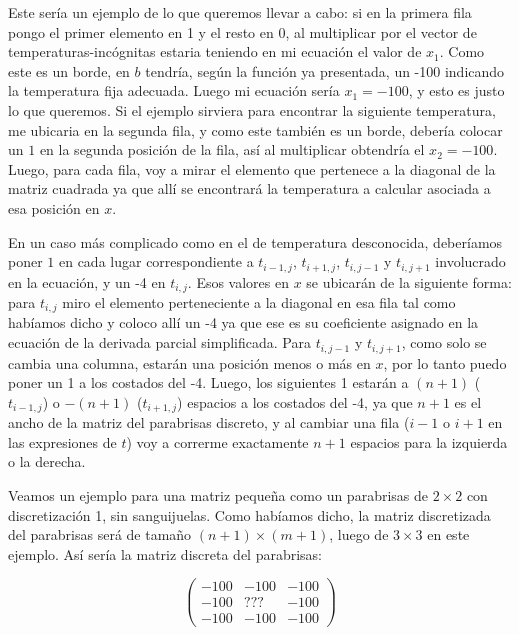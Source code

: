 \vspace{\baselineskip}

Este sería un ejemplo de lo que queremos llevar a cabo: si en la primera fila pongo el primer elemento en 1 y el resto en 0, al multiplicar por el vector de temperaturas-incógnitas estaria teniendo en mi ecuación el valor de $x_1$. Como este es un borde, en $b$ tendría, según la función ya presentada, un -100 indicando la temperatura fija adecuada. Luego mi ecuación sería $x_1 = -100$, y esto es justo lo que queremos. Si el ejemplo sirviera para encontrar la siguiente temperatura, me ubicaria en la segunda fila, y como este también es un borde, debería colocar un $1$ en la segunda posición de la fila, así al multiplicar obtendría el $x_2 = -100$. Luego, para cada fila, voy a mirar el elemento que pertenece a la diagonal de la matriz cuadrada ya que allí se encontrará la temperatura a calcular asociada a esa posición en $x$.

En un caso más complicado como en el de temperatura desconocida, deberíamos poner $1$ en cada lugar correspondiente a $t_{i-1,j}$, $t_{i+1,j}$, $t_{i,j-1}$ y $t_{i,j+1}$ involucrado en la ecuación, y un -4 en $t_{i,j}$. Esos valores en $x$ se ubicarán de la siguiente forma: para $t_{i,j}$ miro el elemento perteneciente a la diagonal en esa fila tal como habíamos dicho y coloco allí un -4 ya que ese es su coeficiente asignado en la ecuación de la derivada parcial simplificada. Para $t_{i,j-1}$ y $t_{i,j+1}$, como solo se cambia una columna, estarán una posición menos o más en $x$, por lo tanto puedo poner un 1 a los costados del -4. Luego, los siguientes 1 estarán a $(n+1)$ ($t_{i-1,j}$) o $-(n+1)$ ($t_{i+1,j}$) espacios a los costados del -4, ya que $n+1$ es el ancho de la matriz del parabrisas discreto, y al cambiar una fila ($i-1$ o $i+1$ en las expresiones de $t$) voy a correrme exactamente $n+1$ espacios para la izquierda o la derecha.

\vspace{\baselineskip}

Veamos un ejemplo para una matriz pequeña como un parabrisas de $2 \times 2$ con discretización 1, sin sanguijuelas. Como habíamos dicho, la matriz discretizada del parabrisas será de tamaño $(n+1) \times (m+1)$, luego de $3 \times 3$ en este ejemplo. Así sería la matriz discreta del parabrisas: 

\vspace{\baselineskip}

\[ \left( \begin{array}{ccc}
-100 & -100 & -100 \\
-100 & ??? & -100 \\
-100 & -100 & -100 
\end{array} \right)\] 

